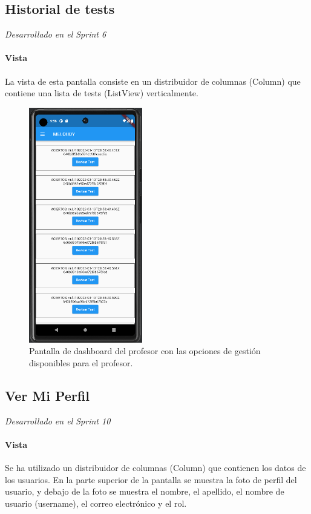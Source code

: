\subsection{Historial de tests}
\textit{Desarrollado en el Sprint 6}
\label{sec:historial}

\paragraph*{Vista}
\label{sec:vista}
La vista de esta pantalla consiste en un distribuidor de columnas (Column) que contiene una lista de tests (ListView) verticalmente. 

\begin{figure}[H]
  \centering
  \includegraphics[width=0.44\textwidth]{imagenes/c7/historialtest.png}
  \caption{Pantalla de dashboard del profesor con las opciones de gestión disponibles para el profesor.}
  \label{fig:login}
\end{figure}


\subsection{Ver Mi Perfil}
\textit{Desarrollado en el Sprint 10}
\label{sec:miperfil}

\paragraph*{Vista}
\label{sec:vista}
Se ha utilizado un distribuidor de columnas (Column) que contienen los datos de los usuarios.
En la parte superior de la pantalla se muestra la foto de perfil del usuario, y debajo de la foto se muestra el nombre, 
el apellido, el nombre de usuario (username), el correo electrónico y el rol.



